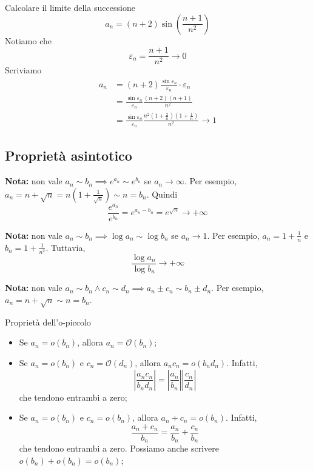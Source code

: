 \documentclass[a4paper]{article}
\begin{document}
\begin{snippetproposition}{}
    Calcolare il limite della successione
    \[
        a_n = (n+2)\sin\left(\frac{n+1}{n^2}\right)
    \]
    Notiamo che
    \[
        \varepsilon_n = \frac{n+1}{n^2} \to 0
    \]
    Scriviamo
    \begin{align*}
        a_n &= (n+2) \frac{\sin \varepsilon_n}{\varepsilon_n} \cdot \varepsilon_n \\
        &= \frac{\sin \varepsilon_n}{\varepsilon_n} \frac{(n+2)(n+1)}{n^2} \\
        &= \frac{\sin \varepsilon_n}{\varepsilon_n} \frac{n^2(1+\frac{2}{n})(1+\frac{1}{n})}{n^2}
        \to 1
    \end{align*}
\end{snippetproposition}

\subsection{Proprietà asintotico}

\textbf{Nota:} non vale \(a_n \sim b_n \implies e^{a_n} \sim e^{b_n}\)
se \(a_n \to \infty\).
Per esempio, \(a_n = n + \sqrt{n} = n(1 + \frac{1}{\sqrt{n}}) \sim n = b_n\).
Quindi
\[
    \frac{e^{a_n}}{e^{b_n}} = e^{a_n-b_n} = e^{\sqrt{n}} \to +\infty
\]

\textbf{Nota:} non vale \(a_n \sim b_n \implies \log a_n \sim \log b_n\)
se \(a_n \to 1\).
Per esempio, \(a_n = 1 + \frac{1}{n}\) e \(b_n = 1 + \frac{1}{n^2}\).
Tuttavia,
\[
    \frac{\log a_n}{\log b_n} \to +\infty
\]

\textbf{Nota:} non vale \(a_n \sim b_n \land c_n \sim d_n \implies a_n \pm c_n \sim b_n \pm d_n\).
Per esempio, \(a_n = n + \sqrt{n} \sim n = b_n\).

\begin{snippetproposition}{Proprietà dell'o-piccolo}
    \begin{itemize}
        \item Se \(a_n = o(b_n)\), allora \(a_n = \mathcal{O}(b_n)\);
        \item Se \(a_n = o(b_n)\) e \(c_n = \mathcal{O}(d_n)\),
        allora \(a_nc_n = o(b_nd_n)\). Infatti,
        \[
            \left|\frac{a_nc_n}{b_nd_n}\right| = \left|\frac{a_n}{b_n}\right| \left|\frac{c_n}{d_n}\right| 
        \]
        che tendono entrambi a zero;
        \item Se \(a_n = o(b_n)\) e \(c_n = o(b_n)\), allora \(a_n + c_n = o(b_n)\).
        Infatti,
        \[
            \frac{a_n + c_n}{b_n} = \frac{a_n}{b_n} + \frac{c_n}{b_n}
        \]
        che tendono entrambi a zero. Possiamo anche scrivere \(o(b_n) + o(b_n) = o(b_n)\);
    \end{itemize}
\end{snippetproposition}
\end{document}
